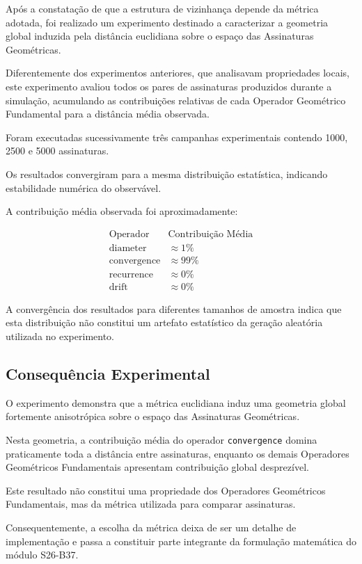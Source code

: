 \documentclass[11pt,a4paper]{article}
\begin{document}
Após a constatação de que a estrutura de vizinhança depende da métrica
adotada, foi realizado um experimento destinado a caracterizar a geometria
global induzida pela distância euclidiana sobre o espaço das Assinaturas
Geométricas.

Diferentemente dos experimentos anteriores, que analisavam propriedades
locais, este experimento avaliou todos os pares de assinaturas produzidos
durante a simulação, acumulando as contribuições relativas de cada Operador
Geométrico Fundamental para a distância média observada.

Foram executadas sucessivamente três campanhas experimentais contendo
1000, 2500 e 5000 assinaturas.

Os resultados convergiram para a mesma distribuição estatística, indicando
estabilidade numérica do observável.

A contribuição média observada foi aproximadamente:

\[
\begin{array}{c|c}
\text{Operador} & \text{Contribuição Média} \\
\hline
\mathrm{diameter} & \approx 1\% \\
\mathrm{convergence} & \approx 99\% \\
\mathrm{recurrence} & \approx 0\% \\
\mathrm{drift} & \approx 0\%
\end{array}
\]

A convergência dos resultados para diferentes tamanhos de amostra indica
que esta distribuição não constitui um artefato estatístico da geração
aleatória utilizada no experimento.

\subsection{Consequência Experimental}

O experimento demonstra que a métrica euclidiana induz uma geometria global
fortemente anisotrópica sobre o espaço das Assinaturas Geométricas.

Nesta geometria, a contribuição média do operador
\texttt{convergence} domina praticamente toda a distância entre
assinaturas, enquanto os demais Operadores Geométricos Fundamentais
apresentam contribuição global desprezível.

Este resultado não constitui uma propriedade dos Operadores Geométricos
Fundamentais, mas da métrica utilizada para comparar assinaturas.

Consequentemente, a escolha da métrica deixa de ser um detalhe de
implementação e passa a constituir parte integrante da formulação
matemática do módulo S26-B37.
\end{document}
